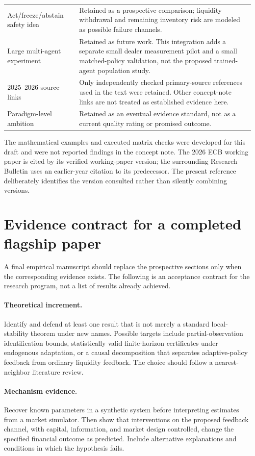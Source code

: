 \documentclass[11pt,a4paper]{article}
\theoremstyle{definition}
\theoremstyle{remark}
\begin{document}
\begin{longtable}{p{}p{}}
Act/freeze/abstain safety idea & Retained as a prospective comparison; liquidity withdrawal and remaining inventory risk are modeled as possible failure channels.\\
Large multi-agent experiment & Retained as future work. This integration adds a separate small dealer measurement pilot and a small matched-policy validation, not the proposed trained-agent population study.\\
2025--2026 source links & Only independently checked primary-source references used in the text were retained. Other concept-note links are not treated as established evidence here.\\
Paradigm-level ambition & Retained as an eventual evidence standard, not as a current quality rating or promised outcome.\\
\end{longtable}
The mathematical examples and executed matrix checks were developed for this draft and were not reported findings in the concept note. The 2026 ECB working paper is cited by its verified working-paper version; the surrounding Research Bulletin uses an earlier-year citation to its predecessor. The present reference deliberately identifies the version consulted rather than silently combining versions.

\clearpage
\section{Evidence contract for a completed flagship paper}
\label{app:contract}
A final empirical manuscript should replace the prospective sections only when the corresponding evidence exists. The following is an acceptance contract for the research program, not a list of results already achieved.

\paragraph{Theoretical increment.}
Identify and defend at least one result that is not merely a standard local-stability theorem under new names. Possible targets include partial-observation identification bounds, statistically valid finite-horizon certificates under endogenous adaptation, or a causal decomposition that separates adaptive-policy feedback from ordinary liquidity feedback. The choice should follow a nearest-neighbor literature review.

\paragraph{Mechanism evidence.}
Recover known parameters in a synthetic system before interpreting estimates from a market simulator. Then show that interventions on the proposed feedback channel, with capital, information, and market design controlled, change the specified financial outcome as predicted. Include alternative explanations and conditions in which the hypothesis fails.
\end{document}
